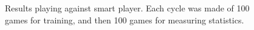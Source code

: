 \begin{figure}[!htb]
\centering
{}


\caption{Results playing against smart player. Each cycle was made of 100 games for training, and then 100 games for measuring statistics.
\label{fig:ttt-results-smart}
}
\end{figure}

